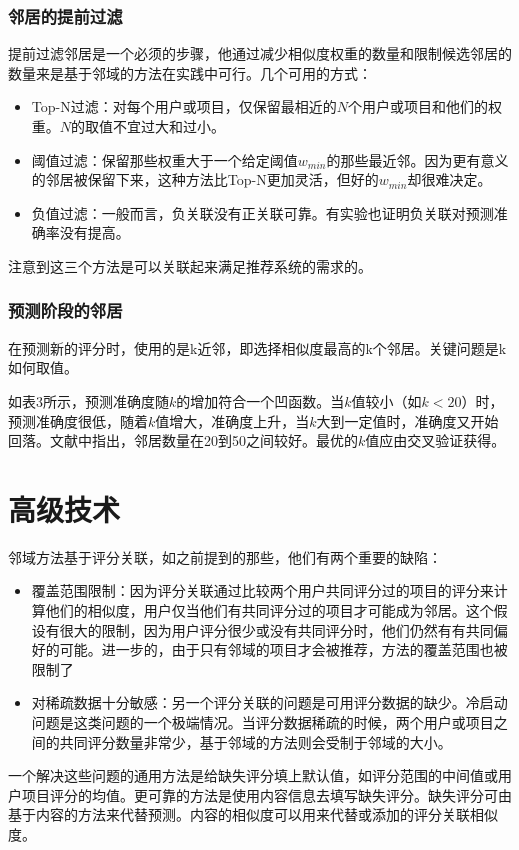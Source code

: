\documentclass{article}
\begin{document}
 \subsubsection{邻居的提前过滤}
 提前过滤邻居是一个必须的步骤，他通过减少相似度权重的数量和限制候选邻居的数量来是基于邻域的方法在实践中可行。几个可用的方式：
 \begin{itemize}
 \item Top-N过滤：对每个用户或项目，仅保留最相近的$N$个用户或项目和他们的权重。$N$的取值不宜过大和过小。
 \item 阈值过滤：保留那些权重大于一个给定阈值$w_{min}$的那些最近邻。因为更有意义的邻居被保留下来，这种方法比Top-N更加灵活，但好的$w_{min}$却很难决定。
 \item 负值过滤：一般而言，负关联没有正关联可靠。有实验也证明负关联对预测准确率没有提高。
 \end{itemize}

 注意到这三个方法是可以关联起来满足推荐系统的需求的。

 \subsubsection{预测阶段的邻居}
 在预测新的评分时，使用的是k近邻，即选择相似度最高的k个邻居。关键问题是k如何取值。

 如表3所示，预测准确度随$k$的增加符合一个凹函数。当$k$值较小（如$k<20$）时，预测准确度很低，随着$k$值增大，准确度上升，当$k$大到一定值时，准确度又开始回落。文献中指出，邻居数量在20到50之间较好。最优的$k$值应由交叉验证获得。

 \section{高级技术}
 邻域方法基于评分关联，如之前提到的那些，他们有两个重要的缺陷：
 \begin{itemize}
 \item 覆盖范围限制：因为评分关联通过比较两个用户共同评分过的项目的评分来计算他们的相似度，用户仅当他们有共同评分过的项目才可能成为邻居。这个假设有很大的限制，因为用户评分很少或没有共同评分时，他们仍然有有共同偏好的可能。进一步的，由于只有邻域的项目才会被推荐，方法的覆盖范围也被限制了
 \item 对稀疏数据十分敏感：另一个评分关联的问题是可用评分数据的缺少。冷启动问题是这类问题的一个极端情况。当评分数据稀疏的时候，两个用户或项目之间的共同评分数量非常少，基于邻域的方法则会受制于邻域的大小。
 \end{itemize}

 一个解决这些问题的通用方法是给缺失评分填上默认值，如评分范围的中间值或用户项目评分的均值。更可靠的方法是使用内容信息去填写缺失评分。缺失评分可由基于内容的方法来代替预测。内容的相似度可以用来代替或添加的评分关联相似度。
\end{document}
